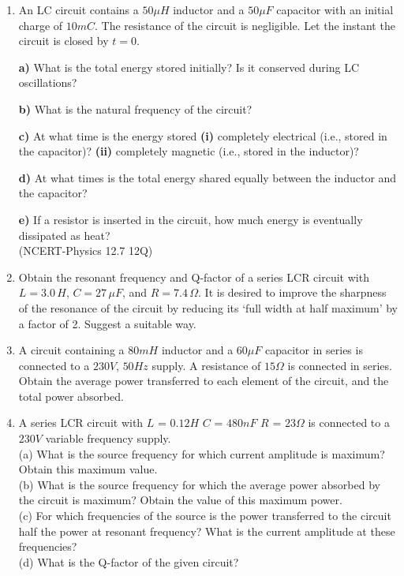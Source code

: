 \begin{enumerate}[label=\thesection.\arabic*,ref=\thesection.\theenumi]
\item An LC circuit contains a $50 \mu H$ inductor and a $50 \mu F$ capacitor with an initial charge of $10 mC$. The resistance of the circuit is negligible. Let the instant the circuit is closed by $t = 0$.

\textbf{a)} What is the total energy stored initially? Is it conserved during LC oscillations?

\textbf{b)} What is the natural frequency of the circuit?

\textbf{c)} At what time is the energy stored \textbf{(i)} completely electrical (i.e., stored in the capacitor)? \textbf{(ii)} completely magnetic (i.e., stored in the inductor)?

\textbf{d)} At what times is the total energy shared equally between the inductor and the capacitor?

\textbf{e)} If a resistor is inserted in the circuit, how much energy is eventually dissipated as heat? \\
\hfill(NCERT-Physics 12.7 12Q)\\
\solution 
\pagebreak 

\item Obtain the resonant frequency and Q-factor of a series LCR circuit with $L = 3.0\, H$, $C = 27\, \mu F$, and $R = 7.4\, \Omega$. It is desired to improve the sharpness of the resonance of the circuit by reducing its `full width at half maximum' by a factor of 2. Suggest a suitable way.\\
\solution


\pagebreak
\item A circuit containing a $80 mH$ inductor and a $60 \mu F$ capacitor in series is connected to a $230 V$, $50 Hz$ supply. A resistance of $15 \Omega $ is connected in series. Obtain the average power transferred to each element of the circuit, and the total power absorbed.\\
\solution
\pagebreak

\item A series LCR circuit with 
$L$ = $0.12 H$
$C$ = $480 nF$
$R$ = $23 \Omega$
is connected to a $230 V$ variable frequency supply.\\
(a) What is the source frequency for which current amplitude is maximum? Obtain this maximum value.\\
(b) What is the source frequency for which the average power absorbed by the circuit is maximum? Obtain the value of this maximum power.\\
(c) For which frequencies of the source is the power transferred to the circuit half the power at resonant frequency? What is the current amplitude at these frequencies?\\
(d) What is the Q-factor of the given circuit?\\
\solution
\pagebreak
\end{enumerate}
